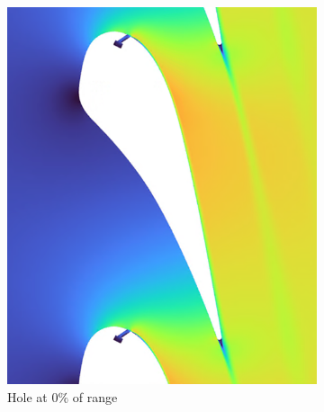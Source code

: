 \documentclass[a4paper, 11pt, oneside]{report}
\begin{document}
\begin{figure}[H]
	\centering
	\begin{subfigure}{.42\textwidth}
		\centering
		\includegraphics[width=\linewidth]{figs/sch_mach_contours_0.png}
		\caption{Hole at $0\%$ of range}
		\vspace{0.018\textheight}
	\end{subfigure}
	\hspace{0.05\textwidth}
	\begin{subfigure}{.42\textwidth}
		\centering

\end{subfigure}
\end{figure}
\end{document}
